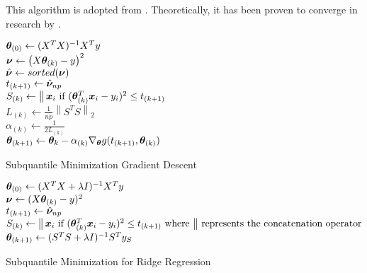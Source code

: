 \documentclass{article} %
\newcommand{\norm}[1]{\left\lVert#1\right\rVert}
\DeclareMathOperator*{\concat}{%
	\mathchoice%
	{\Big\Vert}%
	{\big\Vert}%
	{\Vert}%
	{\Vert}%
}
\begin{document}
	This algorithm is adopted from \cite{Razaviyayn}. Theoretically, it has been proven to converge in research by \cite{Jin_2019}.\\
	\begin{minipage}{0.48\textwidth}
	\begin{algorithm}[H]
		\DontPrintSemicolon
		
		${\bm{\theta}}_{(0)} \gets (X^T X)^{-1}X^T y$\\
		{
			$\displaystyle {\bm{\nu}} \gets \left(X{\bm{\theta}}_{(k)} - y\right)^2$\\
			{
				$\hat{{\bm{\nu}}} \gets sorted({\bm{\nu}})$\\
				$\displaystyle t_{(k+1)} \gets \hat{{\bm{\nu}}}_{np}$\\
			}
			$S_{(k)} \gets \concat \vx_i\text{ if } (\vtheta_{(k)}^T \vx_i - y_i)^2 \leq t_{(k+1)}$\\
			$L_{(k)} \gets \frac{1}{np}\norm{S^T S}_2$\\
			$\alpha_{(k)} \gets \frac{1}{2L_{(k)}}$\\
			$\displaystyle {\bm{\theta}}_{(k+1)} \gets {\bm{\theta}}_k - \alpha_{(k)} \nabla_{\bm{\theta}} g(t_{(k+1)},{\bm{\theta}}_{(k)})$
		}
		\caption{Subquantile Minimization Gradient Descent}
		\label{alg:sqo1}
	\end{algorithm}
	\end{minipage}
	\hfill
	\begin{minipage}{0.48\textwidth}
		\begin{algorithm}[H]
			${\bm{\theta}}_{(0)} \gets (X^T X + \lambda I)^{-1}X^T y$\\
			{
				${\bm{\nu}} \gets (X {\bm{\theta}}_{(k)} - y)^2$\\
				$t_{(k+1)} \gets \hat{{\bm{\nu}}}_{np}$\\
				$S_{(k)} \gets \concat \vx_i\text{ if } (\vtheta_{(k)}^T \vx_i - y_i)^2 \leq t_{(k+1)} \text{ where $\concat$ represents the concatenation operator}$\\
				${\bm{\theta}}_{(k+1)} \gets (S^T S + \lambda I)^{-1}S^T y_S$\\
			}
			\caption{Subquantile Minimization for Ridge Regression}
			\label{alg:sqo-ridge}
		\end{algorithm}
	\end{minipage}
\end{document}
